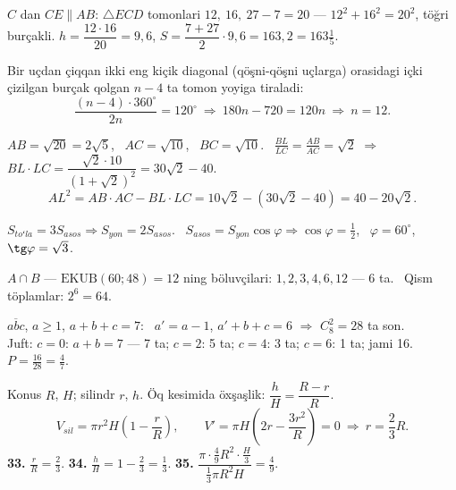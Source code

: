 $C$ dan $CE\parallel AB$: $\triangle ECD$ tomonlari $12,\ 16,\ 27-7=20$ — $12^2+16^2=20^2$, töğri burçakli.
$h=\dfrac{12\cdot16}{20}=9{,}6$, \quad $S=\dfrac{7+27}2\cdot9{,}6=163{,}2=163\frac15$.

Bir uçdan çiqqan ikki eng kiçik diagonal (qöşni-qöşni uçlarga) orasidagi içki çizilgan burçak qolgan $n-4$ ta tomon yoyiga tiraladi:
\[\frac{(n-4)\cdot360^\circ}{2n}=120^\circ\ \Rightarrow\ 180n-720=120n\ \Rightarrow\ n=12.\]

$AB=\sqrt{20}=2\sqrt5$, \ $AC=\sqrt{10}$, \ $BC=\sqrt{10}$. \ $\frac{BL}{LC}=\frac{AB}{AC}=\sqrt2$ $\Rightarrow$ $BL\cdot LC=\dfrac{\sqrt2\cdot10}{(1+\sqrt2)^2}=30\sqrt2-40$.
\[AL^2=AB\cdot AC-BL\cdot LC=10\sqrt2-(30\sqrt2-40)=40-20\sqrt2.\]

$S_{toʻla}=3S_{asos}\Rightarrow S_{yon}=2S_{asos}$. \ $S_{asos}=S_{yon}\cos\varphi\Rightarrow\cos\varphi=\frac12$, \ $\varphi=60^\circ$, \ $\tg\varphi=\sqrt3$.

$A\cap B$ — $\text{EKUB}(60;48)=12$ ning böluvçilari: $1,2,3,4,6,12$ — 6 ta. \ Qism töplamlar: $2^6=64$.

$\overline{abc}$, $a\ge1$, $a+b+c=7$: \ $a'=a-1$, $a'+b+c=6$ $\Rightarrow$ $C_8^2=28$ ta son.\\
Juft: $c=0$: $a+b=7$ — 7 ta; $c=2$: 5 ta; $c=4$: 3 ta; $c=6$: 1 ta; jami 16. \ $P=\frac{16}{28}=\frac47$.

\newpage
{}
Konus $R$, $H$; silindr $r$, $h$. Öq kesimida öxşaşlik: $\dfrac hH=\dfrac{R-r}R$.
\[V_{sil}=\pi r^2H\left(1-\frac rR\right),\qquad V'=\pi H\left(2r-\frac{3r^2}R\right)=0\ \Rightarrow\ r=\frac23R.\]
\textbf{33.} $\frac rR=\frac23$. \quad \textbf{34.} $\frac hH=1-\frac23=\frac13$. \quad \textbf{35.} $\dfrac{\pi\cdot\frac49R^2\cdot\frac H3}{\frac13\pi R^2H}=\frac49$.

